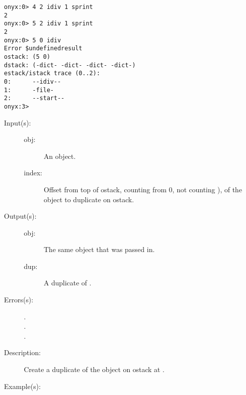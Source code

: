 \begin{description}
\begin{description}
\begin{verbatim}
onyx:0> 4 2 idiv 1 sprint
2
onyx:0> 5 2 idiv 1 sprint
2
onyx:0> 5 0 idiv
Error $undefinedresult
ostack: (5 0)
dstack: (-dict- -dict- -dict- -dict-)
estack/istack trace (0..2):
0:      --idiv--
1:      -file-
2:      --start--
onyx:3>
		\end{verbatim}
	\end{description}
\label{systemdict:idup}
\item[{\onyxop{obj \dots index}{idup}{obj \dots dup}}: ]
	\begin{description}\item[]
	\item[Input(s): ]
		\begin{description}\item[]
		\item[obj: ]
			An object.
		\item[index: ]
			Offset from top of ostack, counting from 0, not counting
			), of the object to duplicate on ostack.
		\end{description}
	\item[Output(s): ]
		\begin{description}\item[]
		\item[obj: ]
			The same object that was passed in.
		\item[dup: ]
			A duplicate of .
		\end{description}
	\item[Errors(s): ]
		\begin{description}\item[]
		\item[.]
		\item[.]
		\item[.]
		\end{description}
	\item[Description: ]
		Create a duplicate of the object on ostack at .
	\item[Example(s): ]\begin{verbatim}


\end{verbatim}
\end{description}
\end{description}
